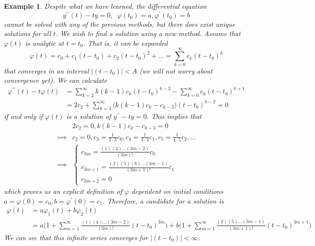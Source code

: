 \documentclass{article}
\newtheorem{example}{Example}[section]
\theoremstyle{remark}
\theoremstyle{definition}
\begin{document}
    \begin{example}
    Despite what we have learned, the differential equation 
    \[y^{\prime\prime} (t) - t y = 0, \;\; \varphi(t_0) = a, \varphi^\prime (t_0) = b\]
    cannot be solved with any of the previous methods, but there does exist unique solutions for all $t$. We wish to find a solution using a new method. Assume that $\varphi(t)$ is analytic at $t= t_0$. That is, it can be expanded
    \[\varphi(t) = c_0 + c_1 (t-t_0) + c_2 (t-t_0)^2 + \ldots = \sum_{k=0}^\infty c_k (t-t_0)^k\]
    that converges in an interval $|(t-t_0)| < A$ (we will not worry about convergence yet). We can calculate
    \begin{align*}
        \varphi^{\prime\prime} (t) - t \varphi(t) & = \sum_{k=2}^\infty k(k-1) c_k (t-t_0)^{k-2} - \sum_{k=0}^\infty c_k (t-t_0)^{k+1} \\
        & = 2 c_2 + \sum_{k=3}^\infty \big( k(k-1) c_k - c_{k-3}\big) (t-t_0)^{k-2} = 0
    \end{align*}
    if and only if $\varphi(t)$ is a solution of $y^{\prime\prime} - t y = 0$. This implies that 
    \begin{align*}
        & 2 c_2 = 0, k(k-1) c_k - c_{k-3} = 0 \\
        \implies & c_2 = 0, c_3 = \frac{1}{2 \cdot 3} c_0, c_4 = \frac{1}{3 \cdot 4} c_1, c_5 = \frac{1}{4 \cdot 5} c_2, ... \\
        \implies & \begin{cases}
        c_{3m} = \frac{(1)(4)...(3m-2)}{(3m)!} c_0 \\
        c_{3m+1} = \frac{(2)(5)(8)...(3m-1)}{(3m+1)!} c_1 \\
        c_{3m+2} = 0
        \end{cases}
    \end{align*}
    which proves us an explicit definition of $\varphi$ dependent on initial conditions $a = \varphi(0) = c_0, b = \varphi^\prime (0) = c_1$. Therefore, a candidate for a solution is
    \begin{align*}
        \varphi(t) & = a \varphi_1 (t) + b \varphi_2 (t) \\
        & = a \bigg( 1 + \sum_{m=1}^\infty \frac{(1)(4)...(3m-2)}{(3m)!} (t-t_0)^{3m} \bigg) + b \bigg( 1 + \sum_{m=1}^\infty \frac{(2)(5)...(3m-1)}{(3m+1)!} (t-t_0)^{3m+1} \bigg)
    \end{align*}
    We can see that this infinite series converges for $|(t-t_0)| < \infty$. 
    \end{example}
\end{document}

